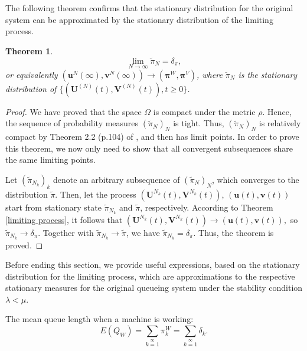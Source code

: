 \documentclass[12pt]{article}
\newtheorem{theorem}{Theorem}[section]
\newcommand{\blue}[1]{\textcolor{blue}{#1}}
\begin{document}
The following theorem confirms that the stationary distribution for the original system can be approximated by the stationary distribution of the limiting process.
\begin{theorem}
\begin{equation*}
 \lim\limits_{N\longrightarrow\infty}\widetilde{\pi}_{N}=\delta_{\pi},
\end{equation*}
or equivalently $(\mathbf{u}^N(\infty),\mathbf{v}^N(\infty))\to (\mathbf{\pi}^{W},\mathbf\pi^{V})$, where $\widetilde{\pi}_{N}$ is the stationary distribution of $\displaystyle \{(\textbf{U}^{(N)}(t), \textbf{V}^{(N)}(t)),t\geq 0\}$.
\end{theorem}

\begin{proof}
We have proved that the space $\Omega$ is compact under the metric $\rho$. Hence, the sequence of probability measures $(\widetilde{\pi}_N)_N$ is tight. Thus, $(\widetilde{\pi}_N)_N$ is relatively compact by Theorem 2.2 (p.104) of \cite {EK}, and then has limit points. In order to prove this theorem, we now only need to show that all convergent subsequences share the same limiting points.

Let $(\widetilde{\pi}_{N_k})_k$ denote an arbitrary subsequence of $(\widetilde{\pi}_N)_N$, which converges to the distribution $\widetilde{\pi}$. Then, let the process $(\textbf{U}^{N_k}(t),\textbf{V}^{N_k}(t))$, $(\textbf{u}(t),\textbf{v}(t))$ start from stationary state $\widetilde{\pi}_{N_k}$ and $\widetilde{\pi}$, respectively. According to Theorem \ref{limiting process}, it follows that $(\textbf{U}^{N_k}(t),\textbf{V}^{N_k}(t))\longrightarrow(\textbf{u}(t),\textbf{v}(t)),$ so $\widetilde{\pi}_{N_k}\longrightarrow\delta_{\pi}$. Together with $\widetilde{\pi}_{N_k}\longrightarrow\widetilde{\pi}$, we have $\widetilde{\pi}_{N_k}=\delta_{\pi}$. Thus, the theorem is proved.
\end{proof}

Before ending this section, we provide useful expressions, based on the stationary distribution for the limiting process, which are approximations to the respective stationary measures for the original queueing system under the stability condition $\lambda<\mu$.

The mean queue length when a machine is working:
\begin{equation}
  E(Q_W)=\sum\limits_{k=1}\limits^{\infty}\pi_{k}^{W}=\sum\limits_{k=1}\limits^{\infty}\delta_k.
\end{equation}
\end{document}
